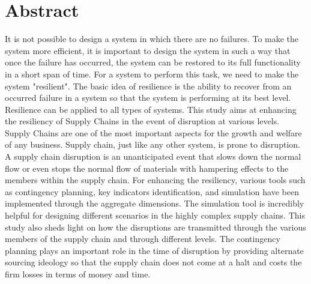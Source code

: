 \chapter*{Abstract}\label{ch:abstract}
 It is not possible to design a system in which there are no failures. To make the system more efficient, it is important to design the system in such a way that once the failure has occurred, the system can be restored to its full functionality in a short span of time. For a system to perform this task, we need to make the system "resilient". The basic idea of resilience is the ability to recover from an occurred failure in a system so that the system is performing at its best level. Resilience can be applied to all types of systems. This study aims at enhancing the resiliency of Supply Chains in the event of disruption at various levels. Supply Chains are one of the most important aspects for the growth and welfare of any business. Supply chain, just like any other system, is prone to disruption. A supply chain disruption is an unanticipated event that slows down the normal flow or even stops the normal flow of materials with hampering effects to the members within the supply chain. For enhancing the resiliency, various tools such as contingency planning, key indicators identification, and simulation have been implemented through the aggregate dimensions. The simulation tool is incredibly helpful for designing different scenarios in the highly complex supply chains. This study also sheds light on how the disruptions are transmitted through the various members of the supply chain and through different levels. The contingency planning plays an important role in the time of disruption by providing alternate sourcing ideology so that the supply chain does not come at a halt and costs the firm losses in terms of money and time.